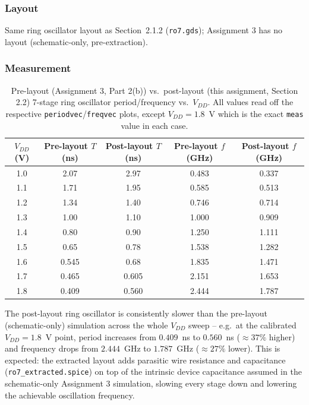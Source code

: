 \subsubsection{Layout}
Same ring oscillator layout as Section~2.1.2 (\texttt{ro7.gds}); Assignment 3
has no layout (schematic-only, pre-extraction).

\subsubsection{Measurement}

\begin{table}[h]
  \centering
  \begin{tabular}{|c|c|c|c|c|}
    \hline
    $V_{DD}$ (V) & Pre-layout $T$ (ns) & Post-layout $T$ (ns) & Pre-layout $f$ (GHz) & Post-layout $f$ (GHz) \\
    \hline
    1.0 & 2.07  & 2.97  & 0.483 & 0.337 \\
    1.1 & 1.71  & 1.95  & 0.585 & 0.513 \\
    1.2 & 1.34  & 1.40  & 0.746 & 0.714 \\
    1.3 & 1.00  & 1.10  & 1.000 & 0.909 \\
    1.4 & 0.80  & 0.90  & 1.250 & 1.111 \\
    1.5 & 0.65  & 0.78  & 1.538 & 1.282 \\
    1.6 & 0.545 & 0.68  & 1.835 & 1.471 \\
    1.7 & 0.465 & 0.605 & 2.151 & 1.653 \\
    1.8 & 0.409 & 0.560 & 2.444 & 1.787 \\
    \hline
  \end{tabular}
  \caption{Pre-layout (Assignment 3, Part 2(b)) vs.\ post-layout (this
  assignment, Section 2.2) 7-stage ring oscillator period/frequency vs.\
  $V_{DD}$. All values read off the respective \texttt{periodvec}/\texttt{freqvec}
  plots, except $V_{DD}=1.8$~V which is the exact \texttt{meas} value in each
  case.}
  \label{tab:2c-compare}
\end{table}

The post-layout ring oscillator is consistently slower than the pre-layout
(schematic-only) simulation across the whole $V_{DD}$ sweep -- e.g.\ at the
calibrated $V_{DD}=1.8$~V point, period increases from $0.409$~ns to
$0.560$~ns ($\approx 37\%$ higher) and frequency drops from $2.444$~GHz to
$1.787$~GHz ($\approx 27\%$ lower). This is expected: the extracted layout
adds parasitic wire resistance and capacitance (\texttt{ro7\_extracted.spice})
on top of the intrinsic device capacitance assumed in the schematic-only
Assignment 3 simulation, slowing every stage down and lowering the achievable
oscillation frequency.

